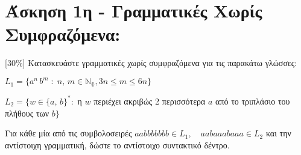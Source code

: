 \section{Άσκηση 1η - Γραμματικές Χωρίς Συμφραζόμενα:}
\label{sec:Exercise_1}
\doublespacing

[30\%] Κατασκευάστε γραμματικές χωρίς συμφραζόμενα για τις παρακάτω γλώσσες:

\bm{\textcolor{blue}{(α)}} $L_1 = \{a^n\,b^m\; : \;n,\,m \in \mathbb{N_0}, 3n \leq m \leq 6n\}$

\bm{\textcolor{blue}{(β)}} $L_2 = \{w \in \{a,\,b\}^* :$ η $w$ περιέχει ακριβώς 2 περισσότερα $a$ από το τριπλάσιο
του πλήθους των $b\}$

Για κάθε μία από τις συμβολοσειρές $aabbbbbbb \in L_1,\quad aabaaabaaa \in L_2$ και την αντίστοιχη γραμματική,
δώστε το αντίστοιχο συντακτικό δέντρο.
\clearpage